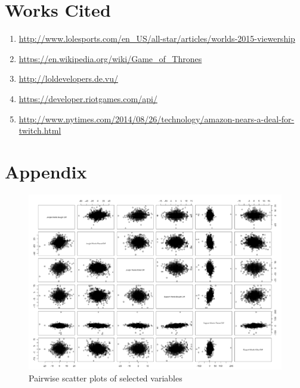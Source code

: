 \documentclass[runningheads]{llncs}
\begin{document}
	\section{Works Cited}
	\begin{enumerate}
		\item[]
		\url{http://www.lolesports.com/en\_US/all-star/articles/worlds-2015-viewership}
		
		\item[]
		\url{https://en.wikipedia.org/wiki/Game\_of\_Thrones}
		
		\item[]
		\url{http://loldevelopers.de.vu/}
		
		\item[]
		\url{https://developer.riotgames.com/api/}
		
		\item[]
		\url{http://www.nytimes.com/2014/08/26/technology/amazon-nears-a-deal-for-twitch.html}
	\end{enumerate}
	
	\section{Appendix}
	
		
	\begin{figure}
		\centering
		\includegraphics[width=1.0\textwidth]{images/pairwise_scatter.png}
		\caption{Pairwise scatter plots of selected variables}
	\end{figure}	
	
  
\end{document}
